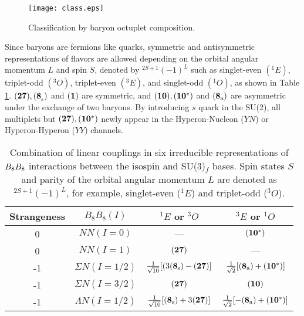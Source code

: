 \begin{figure}[h]
 \begin{center}
   \texttt{[image: class.eps]}
   \caption{Classification by baryon octuplet composition.}
   \label{fig-class}
 \end{center}
\end{figure}

Since baryons are fermions like quarks, symmetric and antisymmetric representations of flavors are allowed depending on the orbital angular momentum $L$ and spin $S$, denoted by $^{2S+1}(-1)^{L}$ such as singlet-even $(^1E)$, triplet-odd $(^3O)$, triplet-even $(^3E)$, and singlet-odd $(^1O)$, as shown in Table \ref{table-BBint}. %
${\bf (27), (8_{\rm_{s}})}$ and ${\bf (1)}$ are symmetric, and ${\bf (10), (10^*)}$ and ${\bf (8_{\rm{a}})}$ are asymmetric under the exchange of two baryons. By introducing $s$ quark in the SU(2), all multiplets but ${\bf (27), (10^*)}$ newly appear in the Hyperon-Nucleon ($YN$) or Hyperon-Hyperon ($YY$) channels. 

\begin{table}[h]
  \begin{center}
    \caption{Combination of linear couplings in six irreducible representations of $B_{8}B_{8}$ interactions between the isospin and SU(3)$_f$ bases. Spin states $S$ and parity of the orbital angular momentum $L$ are denoted as ${}^{2S+1}(-1)^{L}$, for example, singlet-even (${}^{1}E$) and triplet-odd (${}^{3}O$).}
    \begin{tabular}{cccc} \hline \hline
      Strangeness & $B_{8}B_{8}(I)$ & $^1E$ or $^3O$ & $^3E$ or $^1O$ \\ \hline
      0 & $NN (I=0)$ & --- & ${\bf (10^*)}$ \\
      0 & $NN (I=1)$ & ${\bf (27)}$ & --- \\ \hline
      -1 & $\Sigma N (I=1/2)$ & $\frac{1}{\sqrt{10}}[(3({\bf 8_{\rm{s}}})-{\bf (27)}]$ & $\frac{1}{\sqrt{2}}[({\bf 8_{\rm{a}}})+{\bf (10^*)}]$ \\
      -1 & $\Sigma N (I=3/2)$ & ${\bf (27)}$ & ${\bf (10)}$ \\ \hline
      -1 & $\Lambda N (I=1/2)$ & $\frac{1}{\sqrt{10}}[({\bf 8_{\rm{s}}})+3{\bf (27)}]$ & $\frac{1}{\sqrt{2}}[-({\bf 8_{\rm{a}}})+{\bf (10^*)}]$ \\ \hline\hline
   \end{tabular}
   \label{table-BBint}
   \end{center}
\end{table}

